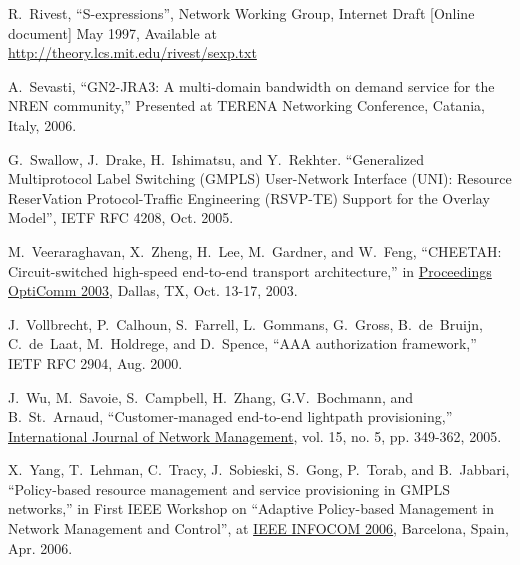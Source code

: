 \documentclass[conference]{IEEEtran}
\begin{document}
\begin{thebibliography}{1}
R.~Rivest,
``S-expressions'',
Network Working Group, Internet Draft [Online document] May 1997,
Available at \\
\url{http://theory.lcs.mit.edu/rivest/sexp.txt}

A.~Sevasti,
``GN2-JRA3: A multi-domain bandwidth on demand service for the NREN community,''
Presented at TERENA Networking Conference, Catania, Italy, 2006.

G.~Swallow, J.~Drake, H.~Ishimatsu, and Y.~Rekhter.
``Generalized Multiprotocol Label Switching (GMPLS) User-Network Interface
(UNI): Resource ReserVation Protocol-Traffic Engineering (RSVP-TE) Support
for the Overlay Model'', IETF RFC 4208, Oct. 2005.

M.~Veeraraghavan, X.~Zheng, H.~Lee, M.~Gardner, and W.~Feng,
``CHEETAH: Circuit-switched high-speed end-to-end transport architecture,''
in \underline{Proceedings OptiComm 2003}, Dallas, TX, Oct. 13-17, 2003.

J.~Vollbrecht, P.~Calhoun, S.~Farrell, L.~Gommans, G.~Gross, B.~de~Bruijn,
C.~de~Laat, M.~Holdrege, and D.~Spence,
``AAA authorization framework,'' IETF RFC 2904, Aug. 2000.

J.~Wu, M.~Savoie, S.~Campbell, H.~Zhang, G.V.~Bochmann, and B.~St.~Arnaud,
``Customer-managed end-to-end lightpath provisioning,''
\underline{International Journal of Network Management},
vol. 15, no. 5, pp. 349-362, 2005.

X.~Yang, T.~Lehman, C.~Tracy, J.~Sobieski, S.~Gong, P.~Torab, and B.~Jabbari,
``Policy-based resource management and service provisioning in GMPLS networks,''
in First IEEE Workshop on ``Adaptive Policy-based Management in Network Management and Control'',
at \underline{IEEE INFOCOM 2006}, Barcelona, Spain, Apr. 2006.

\end{thebibliography}
\end{document}
